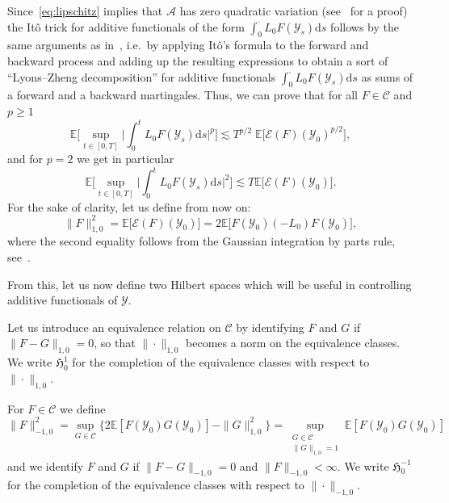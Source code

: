 \documentclass[AHL,Unicode,longabstracts]{cedram}
\newcommand{\mc}[1]{{\mathcal #1}}
\renewcommand{\mc}[1]{{\mathcal #1}}
\newcommand*{\dd}{\mathrm{d}}
\newcommand*{\ds}{\dd s}
\begin{document}
Since~\eqref{eq:lipschitz} implies that $\mc A$ has zero quadratic variation (see~\cite[Proposition~4]{GJSi} for a proof) the It\^o trick for additive functionals of the form $\int_0^{\cdot} L_0 F (\mc Y_s) \ds$ follows by the same arguments as in~\cite[Proposition~3.2]{Gubinelli2015Energy}, i.e.~by applying It\^o's formula to the forward and backward process and adding up the resulting expressions to obtain a sort of ``Lyons--Zheng decomposition'' for additive functionals $\int_0^\cdot L_0 F(\mc Y_s) \ds$ as sums of a forward and a backward martingales. Thus, we can prove that for all $F \in \mathcal{C}$ and $p\geqslant 1$
\begin{equation}\label{eq:ito-bound-cylinder}
\mathbb{E} \bigg[\sup_{t \in [0, T]} \bigg|
\int_0^t L_0 F (\mc Y_s) \ds \bigg|^p \bigg] \lesssim T^{p / 2} \;
\mathbb{E} \big[\mathcal{E} (F) (\mc Y_0)^{p / 2}\big],
\end{equation}
and for $p = 2$ we get in particular
\begin{equation}\label{eq:ito-bound-cylinder-1-norm}
\mathbb{E} \bigg[\sup_{t \in [0, T]}
\bigg| \int_0^t L_0 F (\mc Y_s) \ds \bigg|^2 \bigg]\lesssim T \mathbb{E} \big[\mathcal{E} (F) (\mc Y_0)\big].
\end{equation}
For the sake of clarity, let us define from now on:
\[
\| F
\|_{1,0}^2 = \mathbb{E} \big[\mathcal{E} (F) (\mc Y_0)\big]=2\mathbb{E} \big[F (\mc Y_0) (- L_0) F (\mc Y_0)\big],
\]
where the second equality follows from the Gaussian integration by parts rule, see~\cite[Lemma~1.2.1]{Nualart2006}.


From this, let us now define two Hilbert spaces which will be useful in controlling additive functionals of $\mc Y$.

\begin{defi}
Let us introduce an equivalence relation on $\mathcal{C}$ by identifying $F$ and $G$ if $\|F - G\|_{1,0} = 0$, so that $\| \cdot \|_{1,0}$ becomes a norm on the equivalence classes. We write $\mathfrak{H}^1_0$ for the completion of the equivalence classes with respect to $\| \cdot \|_{1,0}$.

For $F \in \mc C$ we define
\[
\| F \|_{- 1,0}^2 = \sup_{G \in \mathcal{C}} \big\{ 2\mathbb{E} [F (\mc Y_0) G (\mc Y_0)] - \| G \|_{1,0}^2 \big\} = \sup_{\substack{G \in \mathcal{C}\\ \|G \|_{1,0} = 1}} \mathbb{E} [F (\mc Y_0) G (\mc Y_0)]
\]
and we identify $F$ and $G$ if $\| F - G \|_{- 1,0} = 0$ and $\| F \|_{- 1,0} <
\infty$. We write $\mathfrak{H}_0^{- 1}$ for the completion of the equivalence classes with respect to $\| \cdot \|_{- 1,0}$.
\end{defi}
\end{document}
